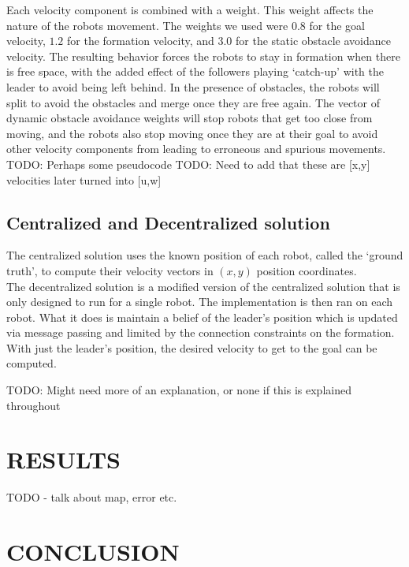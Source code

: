\documentclass[letterpaper, 10 pt, conference]{ieeeconf}  %
\begin{document}
Each velocity component is combined with a weight. This weight affects the nature of the robots movement. The weights we used were $0.8$ for the goal velocity, $1.2$ for the formation velocity, and $3.0$ for the static obstacle avoidance velocity. The resulting behavior forces the robots to stay in formation when there is free space, with the added effect of the followers playing `catch-up' with the leader to avoid being left behind. In the presence of obstacles, the robots will split to avoid the obstacles and merge once they are free again. The vector of dynamic obstacle avoidance weights will stop robots that get too close from moving, and the robots also stop moving once they are at their goal to avoid other velocity components from leading to erroneous and spurious movements. \\

TODO: Perhaps some pseudocode
TODO: Need to add that these are [x,y] velocities later turned into [u,w]

\subsection{Centralized and Decentralized solution}

The centralized solution uses the known position of each robot, called the `ground truth', to compute their velocity vectors in $(x,y)$ position coordinates. \\

The decentralized solution is a modified version of the centralized solution that is only designed to run for a single robot. The implementation is then ran on each robot. What it does is maintain a belief of the leader's position which is updated via message passing and limited by the connection constraints on the formation. With just the leader's position, the desired velocity to get to the goal can be computed.

TODO: Might need more of an explanation, or none if this is explained throughout

\section{RESULTS}

TODO - talk about map, error etc.

\section{CONCLUSION}
\end{document}
